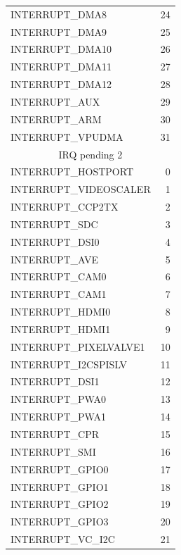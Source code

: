 \documentclass[12pt, svgnames]{book}
\begin{document}
\begin{centering}
{\begin{longtable}{|l | r |}
			 INTERRUPT\_DMA8                 &  24\\
			 INTERRUPT\_DMA9                 &  25\\
			 INTERRUPT\_DMA10                &  26\\
			 INTERRUPT\_DMA11                &  27\\
			 INTERRUPT\_DMA12                &  28\\
			 INTERRUPT\_AUX                &  29\\
			 INTERRUPT\_ARM                  &  30\\
			 INTERRUPT\_VPUDMA               &  31\\
			 \hline
			\multicolumn{2}{|c|}{IRQ pending 2}\\
			\hline
			 INTERRUPT\_HOSTPORT             &  0\\
			 INTERRUPT\_VIDEOSCALER          &  1\\
			 INTERRUPT\_CCP2TX               &  2\\
			 INTERRUPT\_SDC                  &  3\\
			 INTERRUPT\_DSI0                 &  4\\
			 INTERRUPT\_AVE                  &  5\\
			 INTERRUPT\_CAM0                 &  6\\
			 INTERRUPT\_CAM1                 &  7\\
			 INTERRUPT\_HDMI0                &  8\\
			 INTERRUPT\_HDMI1                &  9\\
			 INTERRUPT\_PIXELVALVE1          &  10\\
			 INTERRUPT\_I2CSPISLV            &  11\\
			 INTERRUPT\_DSI1                 &  12\\
			 INTERRUPT\_PWA0                 &  13\\
			 INTERRUPT\_PWA1                 &  14\\
			 INTERRUPT\_CPR                  &  15\\
			 INTERRUPT\_SMI                  &  16\\
			 INTERRUPT\_GPIO0                &  17\\
			 INTERRUPT\_GPIO1                &  18\\
			 INTERRUPT\_GPIO2                &  19\\
			 INTERRUPT\_GPIO3                &  20\\
			 INTERRUPT\_VC\_I2C               &  21\\

\end{longtable}}
\end{centering}
\end{document}
